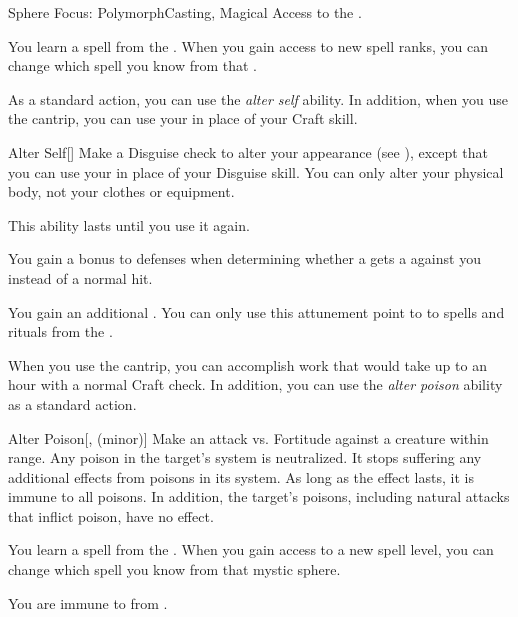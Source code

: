     \begin{feat}{Sphere Focus: Polymorph}{Casting, Magical}
        \featpre Access to the  .

         You learn a spell from the  .
        When you gain access to new spell ranks, you can change which spell you know from that .

         As a standard action, you can use the \textit{alter self} ability.
        In addition, when you use the  cantrip, you can use your  in place of your Craft skill.
        \begin{freeability}{Alter Self}[]
            Make a Disguise check to alter your appearance (see ), except that you can use your  in place of your Disguise skill.
            You can only alter your physical body, not your clothes or equipment.

            This ability lasts until you use it again.
        \end{freeability}

         You gain a  bonus to defenses when determining whether a  gets a  against you instead of a normal hit.

         You gain an additional .
        You can only use this attunement point to  to spells and rituals from the  .

         When you use the  cantrip, you can accomplish work that would take up to an hour with a normal Craft check.
        In addition, you can use the \textit{alter poison} ability as a standard action.
        \begin{freeability}{Alter Poison}[,  (minor)]
            Make an attack vs. Fortitude against a creature within \rngclose range.
            \hit Any poison in the target's system is neutralized.
            It stops suffering any additional effects from poisons in its system.
            As long as the effect lasts, it is immune to all poisons.
            In addition, the target's  poisons, including natural attacks that inflict poison, have no effect.
        \end{freeability}

         You learn a spell from the  .
        When you gain access to a new spell level, you can change which spell you know from that mystic sphere.

         You are immune to  from .
    \end{feat}

